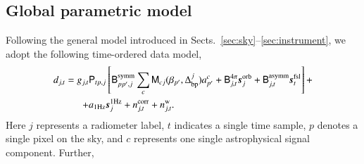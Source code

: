 \documentclass[onecolumn]{aa}
\newcommand{\s}[0]{\vec{s}}
\newcommand{\B}[0]{\tens{B}}
\newcommand{\M}[0]{\tens{M}}
\renewcommand{\P}[0]{\tens{P}}
\newcommand{\Dbp}[0]{\Delta_{\mathrm{bp}}}
\begin{document}
\subsection{Global parametric model}
\label{sec:unimodel}

Following the general model introduced in
Sects.~\ref{sec:sky}--\ref{sec:instrument}, we adopt the following
time-ordered data model,
\begin{equation}
  \begin{split}
    d_{j,t} = g_{j,t}&\P_{tp,j}\left[\B^{\mathrm{symm}}_{pp',j}\sum_{c}
      \M_{cj}(\beta_{p'}, \Dbp^{j})a^c_{p'}  + \B^{4\pi}_{j,t}\s^{\mathrm{orb}}_{j}  
      + \B^{\mathrm{asymm}}_{j,t} \s^{\mathrm{fsl}}_{t} \right]
    +   \label{eq:todmodel} \\
    + &a_{\mathrm{1Hz}}\s^{\mathrm{1Hz}}_{j} + n^{\mathrm{corr}}_{j,t} + n^{\mathrm{w}}_{j,t}.
  \end{split}
\end{equation}
Here $j$ represents a radiometer label, $t$ indicates a single
time sample, $p$ denotes a single pixel on the sky, and $c$ represents
one single astrophysical signal component. Further,
\end{document}

